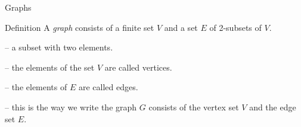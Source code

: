 \documentclass{beamer}
\begin{document}
  \begin{frame}{Graphs}
    \begin{alertblock}{Definition}
    A \emph{graph} consists of a finite set $V$ and a set $E$ of 2-subsets of $V$.
    \end{alertblock}
    \vspace{4mm}
    \begin{description}
      \setlength\itemsep{3mm}
      \item[$2$-subset] -- a subset with two elements.
      \item[Vertices] -- the elements of the set $V$ are called vertices.
      \item[Edges] -- the elements of $E$ are called edges.
      \item[$G = (V,E)$] -- this is the way we write the graph $G$ consists of the vertex set $V$ and the edge set $E$.
    \end{description}
  \end{frame}
  
\end{document}
